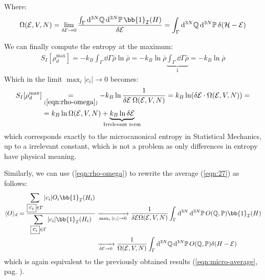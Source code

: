 \documentclass[../template.tex]{subfiles}
\begin{document}
Where:
\begin{align*}
    \Omega(\mathcal{E}, V, N) = \lim_{\delta \mathcal{E}\to 0} \frac{\int_{\Gamma} \dd[3N]{\mathbb{Q}} \dd[3N]{\mathbb{P}} \bb{1}_{\mathcal{I}}(H)}{\delta \mathcal{E}} = \int_{\Gamma} \dd[3N]{\mathbb{Q}} \dd[3N]{\mathbb{P}} \delta(\mathcal{H}- \mathcal{E}) 
\end{align*}

We can finally compute the entropy at the maximum:
\begin{align}
    S_I[\rho^{\max}_d] =
    -k_B\int_{\Gamma}\dd{\Gamma} \bar{\rho} \ln \bar{\rho} = - k_B \ln \bar{\rho} \underbrace{\int_{\Gamma} \dd{\Gamma} \bar{\rho}}_{1}  =
    -k_B \ln \bar{\rho} 
\end{align}
Which in the limit $\max_i |c_i| \to 0$ becomes:
\begin{align*}
    S_{I}[\rho_d^{\max}] &\underset{(\ref{eqn:rho-omega})}{=} - k_B \ln \frac{1}{\delta \mathcal{E}\>  \Omega(\mathcal{E}, V, N)}   = k_B \ln( \delta \mathcal{E} \cdot \Omega(\mathcal{E}, V, N)) =\\
    &= k_B \ln \Omega(\mathcal{E}, V, N) + \underbrace{k_B \ln \delta \mathcal{E}}_{\mathclap{\text{Irrelevant term}}} 
\end{align*}
which corresponds exactly to the microcanonical entropy in Statistical Mechanics, up to a irrelevant constant, which is not a problem as only differences in entropy have physical meaning.

\medskip

Similarly, we can use (\ref{eqn:rho-omega}) to rewrite the average (\ref{eqn:27}) as follows:
\begin{align}
    \label{eqn:32}
    \langle O \rangle_d = \frac{\displaystyle \sum_{\boxed{c_i} \in \Gamma} |c_i| O_i \bb{1}_{\mathcal{I}}(H_i)}{\displaystyle \sum_{\boxed{c_i} \in \Gamma}|c_i| \bb{1}_{\mathcal{I}}(H_i)} & \xrightarrow[\max_i |c_i| \to 0]{} \frac{1}{\delta \mathcal{E}\Omega(\mathcal{E}, V, N)}  \int_{\Gamma} \dd[3N] \dd[3N]{\mathbb{P}} O(\mathbb{Q}, \mathbb{P}) \bb{1}_{\mathcal{I}}(H)\\
    &  \xrightarrow[\delta \mathcal{E} \to 0]{} \frac{1}{\Omega(\mathcal{E}, V, N)}  \int_{\Gamma} \dd[3N]{\mathbb{Q}} \dd[3N]{\mathbb{P}} O(\mathbb{Q}, \mathbb{P}) \delta(H - \mathcal{E})
\end{align}
which is again equivalent to the previously obtained results (\ref{eqn:micro-average}, pag. \pageref{eqn:micro-average}).
\end{document}
